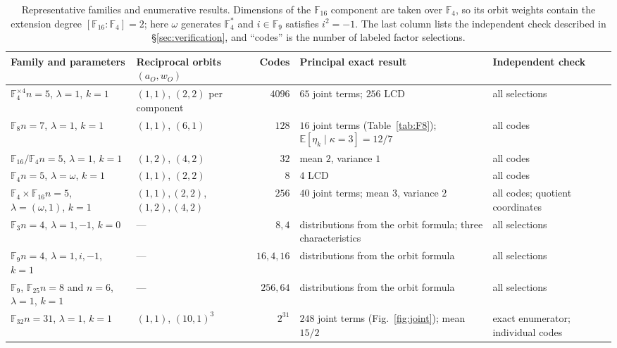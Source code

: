 \documentclass[10pt,a4paper]{article}
\newcommand{\F}{\mathbb F}
\numberwithin{equation}{section}
\theoremstyle{plain}
\theoremstyle{definition}
\theoremstyle{remark}
\begin{document}
\begin{table}[ht]
\centering
\caption{Representative families and enumerative results. Dimensions of the
$\F_{16}$ component are taken over $\F_4$, so its orbit weights contain the
extension degree $[\F_{16}:\F_4]=2$; here $\omega$ generates $\F_4^*$ and
$i\in\F_9$ satisfies $i^2=-1$. The last column lists the independent check
described in \S\ref{sec:verification}, and ``codes'' is the number of labeled
factor selections.}
\label{tab:validation}
\footnotesize
\renewcommand{\arraystretch}{1.25}
\setlength{\tabcolsep}{3.5pt}
\begin{tabularx}{\textwidth}{@{}L{25mm}L{19mm}rL{28mm}>{\raggedright\arraybackslash}X@{}}
\toprule
Family and parameters & Reciprocal orbits $(a_O,w_O)$ & Codes & Principal exact result & Independent check \\
\midrule
$\F_4^{\times4}$\newline $n=5$, $\lambda=1$, $k=1$ & $(1,1)$, $(2,2)$ per component & $4096$ & $65$ joint terms; $256$ LCD & all selections \\
$\F_8$\newline $n=7$, $\lambda=1$, $k=1$ & $(1,1)$, $(6,1)$ & $128$ & $16$ joint terms (Table~\ref{tab:F8}); $\mathbb E[\eta_k\mid\kappa=3]=12/7$ & all codes \\
$\F_{16}\!/\!\F_4$\newline $n=5$, $\lambda=1$, $k=1$ & $(1,2)$, $(4,2)$ & $32$ & mean $2$, variance $1$ & all codes \\
$\F_4$\newline $n=5$, $\lambda=\omega$, $k=1$ & $(1,1)$, $(2,2)$ & $8$ & $4$ LCD & all codes \\
$\F_{4}\!\times\!\F_{16}$\newline $n=5$, $\lambda=(\omega,1)$, $k=1$ & $(1,1),(2,2)$, $(1,2),(4,2)$ & $256$ & $40$ joint terms; mean $3$, variance $2$ & all codes; quotient coordinates \\
$\F_3$\newline $n=4$, $\lambda=1,-1$, $k=0$ & --- & $8,4$ & distributions from the orbit formula; three characteristics & all selections \\
$\F_9$\newline $n=4$, $\lambda=1,i,-1$, $k=1$ & --- & $16,4,16$ & distributions from the orbit formula & all selections \\
$\F_9$, $\F_{25}$\newline $n=8$ and $n=6$, $\lambda=1$, $k=1$ & --- & $256,64$ & distributions from the orbit formula & all selections \\
$\F_{32}$\newline $n=31$, $\lambda=1$, $k=1$ & $(1,1)$, $(10,1)^3$ & $2^{31}$ & $248$ joint terms (Fig.~\ref{fig:joint}); mean $15/2$ & exact enumerator; individual codes \\
\bottomrule
\end{tabularx}
\end{table}
\end{document}
